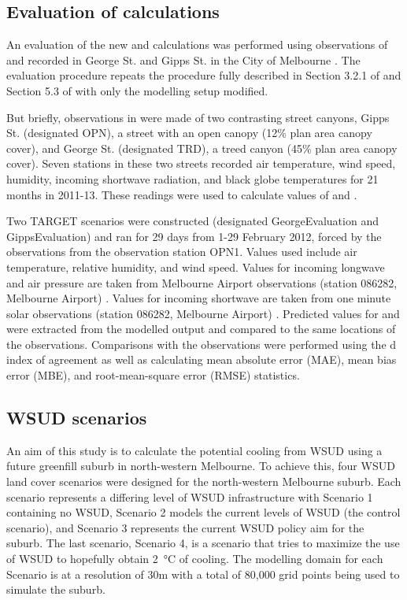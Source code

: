 \documentclass[final,3p,times,authoryear]{elsarticle}
\begin{document}
\subsection{Evaluation of  calculations}\label{sec:methods_eval}

An evaluation of the new  and  calculations was performed using observations of  and  recorded in George St. and Gipps St. in the City of Melbourne \citep{Coutts2015}. The evaluation procedure repeats the procedure fully described in Section 3.2.1 of \cite{Nice2018} and Section 5.3 of \cite{Nice2016} with only the modelling setup modified. 

But briefly, observations in \cite{Coutts2015} were made of two contrasting street canyons, Gipps St. (designated OPN), a street with an open canopy (12\% plan area canopy cover), and George St. (designated TRD), a treed canyon (45\% plan area canopy cover). Seven stations in these two streets recorded air temperature, wind speed, humidity, incoming shortwave radiation, and black globe temperatures for 21 months in 2011-13. These readings were used to calculate values of  and . 


Two TARGET scenarios were constructed (designated GeorgeEvaluation and GippsEvaluation) and ran for 29 days from 1-29 February 2012, forced by the observations from the observation station OPN1. Values used include air temperature, relative humidity, and wind speed. Values for incoming longwave and air pressure are taken from Melbourne Airport observations (station 086282, Melbourne Airport) \citep{BOM2016b}. Values for incoming shortwave are taken from one minute solar observations (station 086282, Melbourne Airport) \citep{BOM2016}. Predicted values for  and  were extracted from the modelled output and compared to the same locations of the observations. Comparisons with the observations were performed using the \cite{Willmott1981} d index of agreement as well as calculating mean absolute error (MAE), mean bias error (MBE), and root-mean-square error (RMSE) statistics.




\subsection{WSUD scenarios}\label{sec:methods_wsudscenarios}
An aim of this study is to calculate the potential cooling from WSUD using a future greenfill suburb in north-western Melbourne. To achieve this, four WSUD land cover scenarios were designed for the north-western Melbourne suburb. Each scenario represents a differing level of WSUD infrastructure with Scenario 1 containing no WSUD, Scenario 2 models the current levels of WSUD (the control scenario), and Scenario 3 represents the current WSUD policy aim for the suburb. The last scenario, Scenario 4, is a scenario that tries to maximize the use of WSUD to hopefully obtain 2\SI{}{\degreeCelsius} of cooling. The modelling domain for each Scenario is at a resolution of 30m with a total of 80,000 grid points being used to simulate the suburb.
\end{document}
